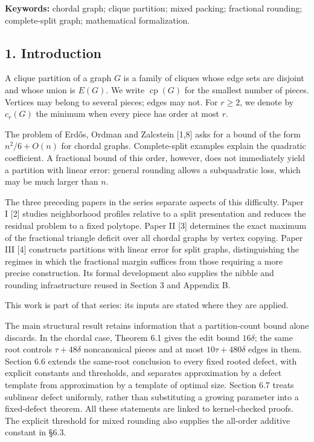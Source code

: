 \documentclass[english,11pt,a4paper]{article}
\begin{document}
\textbf{Keywords:} chordal graph; clique partition; mixed packing; fractional rounding; complete-split graph; mathematical formalization.

\subsection{1. Introduction}\label{introduction}

A clique partition of a graph \(G\) is a family of cliques whose edge sets are disjoint and whose union is \(E(G)\). We write \(\operatorname{cp}(G)\) for the smallest number of pieces. Vertices may belong to several pieces; edges may not. For \(r\ge2\), we denote by \(c_r(G)\) the minimum when every piece has order at most \(r\).

The problem of Erdős, Ordman and Zalcstein {[}1,8{]} asks for a bound of the form \(n^2/6+O(n)\) for chordal graphs. Complete-split examples explain the quadratic coefficient. A fractional bound of this order, however, does not immediately yield a partition with linear error: general rounding allows a subquadratic loss, which may be much larger than \(n\).

The three preceding papers in the series separate aspects of this difficulty. Paper I {[}2{]} studies neighborhood profiles relative to a split presentation and reduces the residual problem to a fixed polytope. Paper II {[}3{]} determines the exact maximum of the fractional triangle deficit over all chordal graphs by vertex copying. Paper III {[}4{]} constructs partitions with linear error for split graphs, distinguishing the regimes in which the fractional margin suffices from those requiring a more precise construction. Its formal development also supplies the nibble and rounding infrastructure reused in Section 3 and Appendix B.

This work is part of that series: its inputs are stated where they are applied.

The main structural result retains information that a partition-count bound alone discards. In the chordal case, Theorem 6.1 gives the edit bound \(16\delta\); the same root controls \(\tau+48\delta\) noncanonical pieces and at most \(10\tau+480\delta\) edges in them. Section 6.6 extends the same-root conclusion to every fixed rooted defect, with explicit constants and thresholds, and separates approximation by a defect template from approximation by a template of optimal size. Section 6.7 treats sublinear defect uniformly, rather than substituting a growing parameter into a fixed-defect theorem. All these statements are linked to kernel-checked proofs. The explicit threshold for mixed rounding also supplies the all-order additive constant in §6.3.
\end{document}

